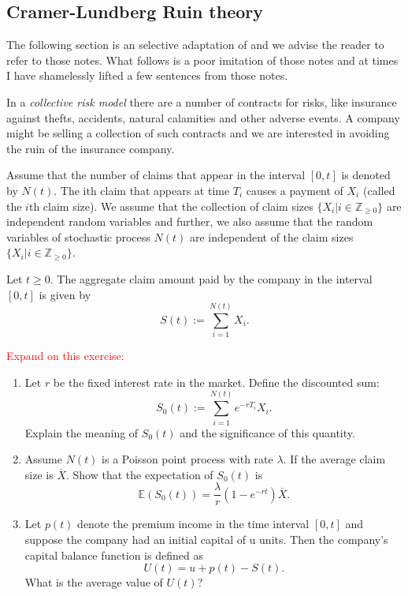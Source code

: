 \documentclass[letterpaper, 12pt]{article}
\newcommand{\1}{\mathds{1}} %
\theoremstyle{definition}
\begin{document}
\subsection{Cramer-Lundberg Ruin theory}

The following section is an selective adaptation of \cite{SR05} and we advise the reader to refer to those notes. What follows is a poor imitation of those notes and at times I have shamelessly lifted a few sentences from those notes. 

In a \emph{collective risk model} there are a number of contracts for risks, like insurance against thefts, accidents, natural calamities and other adverse events. A company might be selling a collection of such contracts and we are interested in avoiding the ruin of the insurance company. 

Assume that the number of claims that appear in the interval $[0,t]$ is denoted by $N(t)$. The ith claim that appears at time $T_{i}$ causes a payment of $X_{i}$ (called the $i$th claim size). We assume that the collection of claim sizes $\{X_{i}|i \in \mathbb{Z}_{\geq 0}\}$ are independent random variables and further, we also assume that the random variables of stochastic process $N(t)$ are independent of the claim sizes $\{X_{i}|i\in\mathbb{Z}_{\geq0}\}$.

Let $t \geq 0$. The aggregate claim amount paid by the company in the interval $[0,t]$ is given by \[S(t):=\sum_{i=1}^{N(t)}X_{i}.\] 

\textcolor{red}{Expand on this exercise:}
\begin{enumerate}
\item Let $r$ be the fixed interest rate in the market. Define the discounted sum:\[S_{0}(t):=\sum_{i=1}^{N(t)}e^{-rT_{i}}X_{i}.\]Explain the meaning of $S_{0}(t)$ and the significance of this quantity.

\item Assume $N(t)$ is a Poisson point process with rate $\lambda$. If the average claim size is $\overline{X}$. Show that the expectation of $S_{0}(t)$ is $$\mathbb{E}(S_{0}(t))=\dfrac{\lambda}{r}(1-e^{-rt})\overline{X}.$$

\item Let $p(t)$ denote the premium income in the time interval $[0,t]$ and suppose the company had an initial capital of u units. Then the company's capital balance function is defined as \[U(t)=u+p(t)-S(t).\] What is the average value of $U(t)$?
\end{enumerate}
\end{document}
